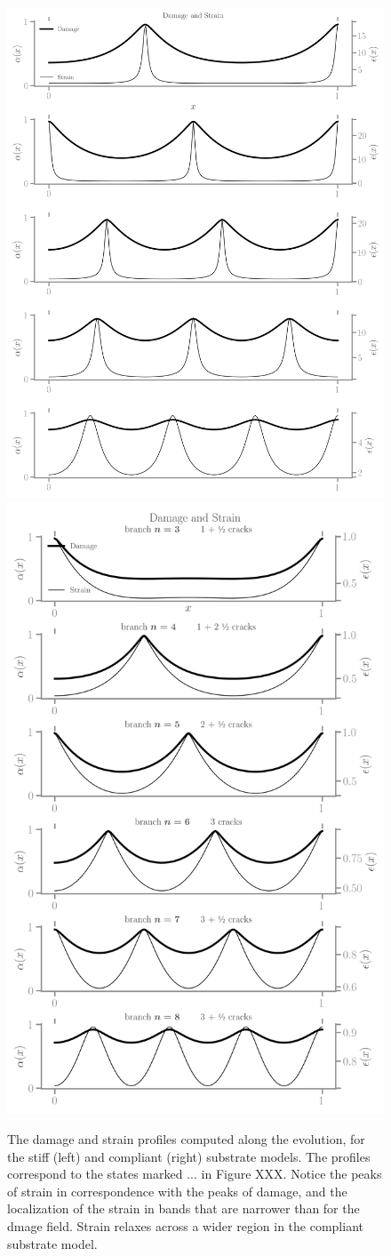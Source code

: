 \begin{figure}[htbp]
    \centering
    \includegraphics*[width=.45\textwidth]{../images/model_stiff_fields.png}
    \includegraphics*[width=.45\textwidth]{../images/model_compliant_fields.png}
    \caption{The damage and strain profiles computed along the evolution, for the stiff (left) and compliant (right) substrate models. The profiles correspond to the states marked $...$ in Figure XXX. Notice the peaks of strain in correspondence with the peaks of damage, and the localization of the strain in bands that are narrower than for the dmage field. Strain relaxes across a wider region in the compliant substrate model.}
    \label{fig:}
\end{figure}


